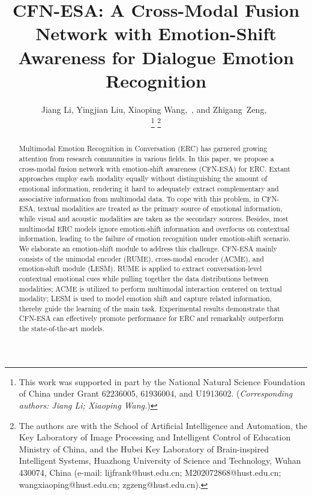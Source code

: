 \documentclass[journal]{IEEEtran}
\begin{document}
\title{CFN-ESA: A Cross-Modal Fusion Network with Emotion-Shift Awareness for Dialogue Emotion Recognition}
\author{Jiang Li\hspace{-1.5mm}\orcidA{}, Yingjian Liu, Xiaoping Wang\hspace{-1.5mm}\orcidB{},~, and Zhigang~Zeng\hspace{-1.5mm}\orcidC{},~


\thanks{This work was supported in part by the National Natural Science Foundation of China under Grant 62236005, 61936004, and U1913602. (\textit{Corresponding authors: Jiang Li; Xiaoping Wang.})}
\thanks{The authors are with the School of Artificial Intelligence and Automation, the Key Laboratory of Image Processing and Intelligent Control of Education Ministry of China, and the Hubei Key Laboratory of Brain-inspired Intelligent Systems, Huazhong University of Science and Technology, Wuhan 430074, China (e-mail: lijfrank@hust.edu.cn; M202072868@hust.edu.cn; wangxiaoping@hust.edu.cn; zgzeng@hust.edu.cn).}}





\maketitle

\begin{abstract}
Multimodal Emotion Recognition in Conversation (ERC) has garnered growing attention from research communities in various fields. In this paper, we propose a cross-modal fusion network with emotion-shift awareness (CFN-ESA) for ERC. Extant approaches employ each modality equally without distinguishing the amount of emotional information, rendering it hard to adequately extract complementary and associative information from multimodal data. To cope with this problem, in CFN-ESA, textual modalities are treated as the primary source of emotional information, while visual and acoustic modalities are taken as the secondary sources. Besides, most multimodal ERC models ignore emotion-shift information and overfocus on contextual information, leading to the failure of emotion recognition under emotion-shift scenario. We elaborate an emotion-shift module to address this challenge. CFN-ESA mainly consists of the unimodal encoder (RUME), cross-modal encoder (ACME), and emotion-shift module (LESM). RUME is applied to extract conversation-level contextual emotional cues while pulling together the data distributions between modalities; ACME is utilized to perform multimodal interaction centered on textual modality; LESM is used to model emotion shift and capture related information, thereby guide the learning of the main task. Experimental results demonstrate that CFN-ESA can effectively promote performance for ERC and remarkably outperform the state-of-the-art models.
\end{abstract}
\end{document}
